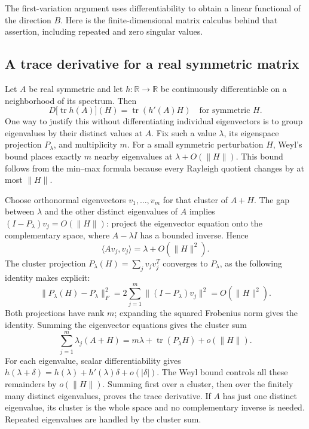 \documentclass[11pt]{article}
\numberwithin{equation}{section}
\begin{document}
The first-variation argument uses differentiability to obtain a linear
functional of the direction $B$. Here is the finite-dimensional matrix
calculus behind that assertion, including repeated and zero singular values.

\subsection*{A trace derivative for a real symmetric matrix}
Let $A$ be real symmetric and let $h:\mathbb R\to\mathbb R$ be continuously
differentiable on a neighborhood of its spectrum. Then
\[
 D\bigl[\operatorname{tr}h(A)\bigr](H)
       =\operatorname{tr}(h'(A)H)
 \quad\text{for symmetric }H.
\]
One way to justify this without differentiating individual eigenvectors
is to group eigenvalues by their distinct values at $A$.
Fix such a value $\lambda$, its eigenspace projection $P_\lambda$, and
multiplicity $m$. For a small symmetric perturbation $H$, Weyl's bound
places exactly $m$ nearby eigenvalues at $\lambda+O(\|H\|)$.
This bound follows from the min--max formula because every Rayleigh
quotient changes by at most $\|H\|$.

Choose orthonormal eigenvectors $v_1,\ldots,v_m$ for that cluster of
$A+H$. The gap between $\lambda$ and the other distinct eigenvalues of
$A$ implies $(I-P_\lambda)v_j=O(\|H\|)$: project the eigenvector
equation onto the complementary space, where $A-\lambda I$ has a
bounded inverse. Hence
\[
 \langle Av_j,v_j\rangle=\lambda+O(\|H\|^2).
\]
The cluster projection $P_\lambda(H)=\sum_jv_jv_j^T$ converges to
$P_\lambda$, as the following identity makes explicit:
\[
 \|P_\lambda(H)-P_\lambda\|_F^2
   =2\sum_{j=1}^m\|(I-P_\lambda)v_j\|^2=O(\|H\|^2).
\]
Both projections have rank $m$; expanding the squared Frobenius norm
gives the identity. Summing the eigenvector equations gives the cluster sum
\[
 \sum_{j=1}^m\lambda_j(A+H)
   =m\lambda+\operatorname{tr}(P_\lambda H)+o(\|H\|).
\]
For each eigenvalue, scalar differentiability gives
$h(\lambda+\delta)=h(\lambda)+h'(\lambda)\delta+o(|\delta|)$.
The Weyl bound controls all these remainders by $o(\|H\|)$.
Summing first over a cluster, then over the finitely many distinct
eigenvalues, proves the trace derivative. If $A$ has just one distinct
eigenvalue, its cluster is the whole space and no complementary inverse
is needed. Repeated eigenvalues are handled by the cluster sum.
\end{document}

